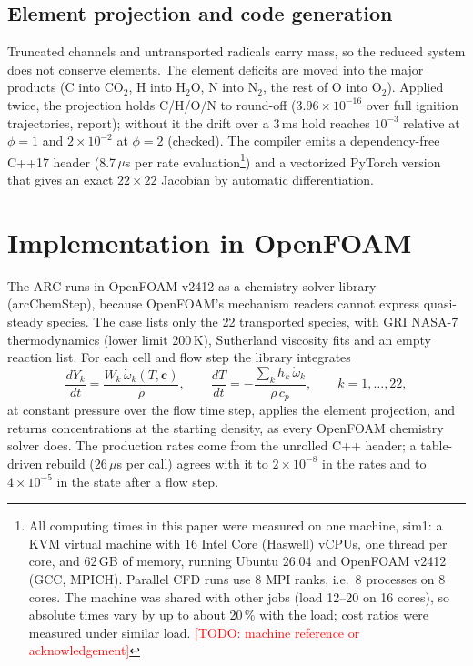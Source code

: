 \documentclass[preprint,review,12pt]{elsarticle}
\providecommand{\todo}[1]{}
\renewcommand{\todo}[1]{\textcolor{red}{[TODO: #1]}}
\newcommand{\ce}[1]{\ensuremath{\mathrm{#1}}}
\begin{document}
\subsection{Element projection and code generation}
Truncated channels and untransported radicals carry mass, so the reduced system does not conserve elements. The
element deficits are moved into the major products (C into \ce{CO_{2}}, H into \ce{H_{2}O}, N into \ce{N_{2}}, the rest of O
into \ce{O_{2}}). Applied twice, the projection holds C/H/O/N to round-off ($3.96\times10^{-16}$ over full ignition
trajectories, report); without it the drift over a 3\,ms hold reaches $10^{-3}$ relative at $\phi=1$ and
$2\times10^{-2}$ at $\phi=2$ (checked). The compiler emits a dependency-free C++17 header (8.7\,$\mu$s per rate
evaluation\footnote{All computing times in this paper were measured on one machine, sim1: a KVM virtual machine with
16 Intel Core (Haswell) vCPUs, one thread per core, and 62\,GB of memory, running Ubuntu 26.04 and OpenFOAM v2412
(GCC, MPICH). Parallel CFD runs use 8 MPI ranks, i.e.\ 8 processes on 8 cores. The machine was shared with other jobs
(load 12--20 on 16 cores), so absolute times vary by up to about 20\,\% with the load; cost ratios were measured
under similar load. \todo{machine reference or acknowledgement}}) and a vectorized PyTorch version that gives an exact $22\times22$ Jacobian by automatic differentiation.

\section{Implementation in OpenFOAM}
\label{sec:impl}

The ARC runs in OpenFOAM v2412 as a chemistry-solver library (arcChemStep), because OpenFOAM's mechanism readers
cannot express quasi-steady species. The case lists only the 22 transported species, with GRI NASA-7 thermodynamics
(lower limit 200\,K), Sutherland viscosity fits and an empty reaction list. For each cell and flow step the library
integrates
\begin{equation}
\frac{dY_k}{dt}=\frac{W_k\,\dot\omega_k(T,\mathbf{c})}{\rho},\qquad
\frac{dT}{dt}=-\frac{\sum_k h_k\,\dot\omega_k}{\rho\,c_p},\qquad k=1,\dots,22,
\end{equation}
at constant pressure over the flow time step, applies the element projection, and returns concentrations at the
starting density, as every OpenFOAM chemistry solver does. The production rates come from the unrolled C++ header; a
table-driven rebuild (26\,$\mu$s per call) agrees with it to $2\times10^{-8}$ in the rates and to $4\times10^{-5}$
in the state after a flow step.
\end{document}
